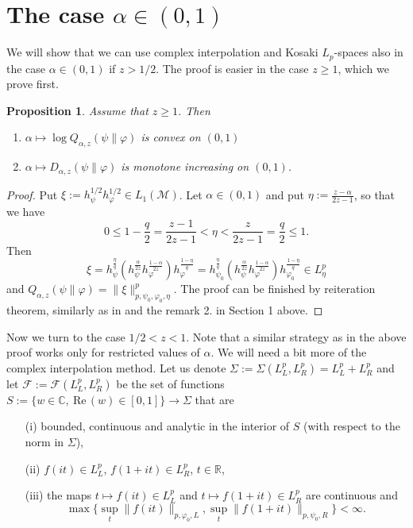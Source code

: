 \documentclass[12pt]{article}
\newtheorem{prop}{Proposition}
\theoremstyle{definition}
\theoremstyle{remark}
\def\Me{\mathcal M}
\def\Fe{\mathcal F}
\begin{document}
\section{The case $\alpha\in (0,1)$}

We will show that we can use complex interpolation and Kosaki $L_p$-spaces  also in the case $\alpha\in (0,1)$ if
$z>1/2$. 
The proof is easier in the case $z\ge 1$, which we prove first.

\begin{prop}\label{prop:incr}
Assume that $z\ge 1$.  Then 
\begin{enumerate}
\item $\alpha\mapsto \log
Q_{\alpha,z}(\psi\|\varphi)$ is convex on $(0,1)$
\item $\alpha\mapsto D_{\alpha,z}(\psi\|\varphi)$ is monotone increasing on $(0,1)$.
\end{enumerate}

\end{prop}



\begin{proof}  Put $\xi:=h_\psi^{1/2}h_\varphi^{1/2}\in L_1(\Me)$. Let $\alpha\in (0,1)$ and put
$\eta:=\tfrac{z-\alpha}{2z-1}$, so that we have 
\[
0\le 1-\frac q2=\frac{z-1}{2z-1}<\eta< \frac{z}{2z-1}=\frac q2\le 1.
\]
Then 
\[
\xi=h_\psi^{\frac{\eta}q}(h_\psi^{\frac{\alpha}{2z}}h_\varphi^{\frac{1-\alpha}{2z}})h_\varphi^{\frac{1-\eta}q}=
h_{\psi_0}^{\frac{\eta}q}(h_\psi^{\frac{\alpha}{2z}}h_\varphi^{\frac{1-\alpha}{2z}})h_{\varphi_0}^{\frac{1-\eta}q}\in
L^p_\eta
\]
and $Q_{\alpha,z}(\psi\|\varphi)=\|\xi\|^p_{p,\psi_0,\varphi_0,\eta}$. The proof can be
finished by reiteration theorem,  similarly as in \cite[Prop. 0.1]{FHnote6} and the remark
2. in Section 1 above.




\end{proof}



Now we turn to the case $1/2<z<1$. Note that a similar strategy as in the above proof
works only for  restricted values of $\alpha$. We will need a bit more of the complex
interpolation method. Let us denote 
$\Sigma:=\Sigma(L^p_L,L^p_R)=L_L^p+L^p_R$ and let
$\Fe:=\Fe(L^p_L,L^p_R)$ be the set of functions $S:=\{w\in \mathbb C,\ \mathrm{Re}\,(w)\in
[0,1]\}\to \Sigma$ that are 
\begin{enumerate}
\item[(i)] bounded, continuous and analytic in the interior of $S$ (with respect
to the norm in $\Sigma$),
\item[(ii)] $f(it)\in L^p_L$, $f(1+it)\in L^p_R$, $t\in \mathbb R$,
\item[(iii)] the maps $t\mapsto f(it)\in L^p_L$ and $t\mapsto f(1+it)\in L^p_R$ are
continuous and 
\[
\max\{\sup_{t}\|f(it)\|_{p,\varphi_0,L},\sup_{t}\|f(1+it)\|_{p,\psi_0,R}\}<\infty.
\]
\end{enumerate}
\end{document}
